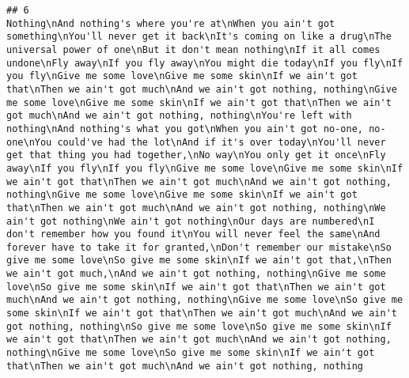 \documentclass[]{article}
\begin{document}
\begin{verbatim}
## 6                                                                                                                                                                                                                                                                                                                                                                                                                                                                                                                                                                                                                                                                                                                                                                                                                                                                                                                                                                                                                                                                                                                                                                                                                                                Nothing\nAnd nothing's where you're at\nWhen you ain't got something\nYou'll never get it back\nIt's coming on like a drug\nThe universal power of one\nBut it don't mean nothing\nIf it all comes undone\nFly away\nIf you fly away\nYou might die today\nIf you fly\nIf you fly\nGive me some love\nGive me some skin\nIf we ain't got that\nThen we ain't got much\nAnd we ain't got nothing, nothing\nGive me some love\nGive me some skin\nIf we ain't got that\nThen we ain't got much\nAnd we ain't got nothing, nothing\nYou're left with nothing\nAnd nothing's what you got\nWhen you ain't got no-one, no-one\nYou could've had the lot\nAnd if it's over today\nYou'll never get that thing you had together,\nNo way\nYou only get it once\nFly away\nIf you fly\nIf you fly\nGive me some love\nGive me some skin\nIf we ain't got that\nThen we ain't got much\nAnd we ain't got nothing, nothing\nGive me some love\nGive me some skin\nIf we ain't got that\nThen we ain't got much\nAnd we ain't got nothing, nothing\nWe ain't got nothing\nWe ain't got nothing\nOur days are numbered\nI don't remember how you found it\nYou will never feel the same\nAnd forever have to take it for granted,\nDon't remember our mistake\nSo give me some love\nSo give me some skin\nIf we ain't got that,\nThen we ain't got much,\nAnd we ain't got nothing, nothing\nGive me some love\nSo give me some skin\nIf we ain't got that\nThen we ain't got much\nAnd we ain't got nothing, nothing\nGive me some love\nSo give me some skin\nIf we ain't got that\nThen we ain't got much\nAnd we ain't got nothing, nothing\nSo give me some love\nSo give me some skin\nIf we ain't got that\nThen we ain't got much\nAnd we ain't got nothing, nothing\nGive me some love\nSo give me some skin\nIf we ain't got that\nThen we ain't got much\nAnd we ain't got nothing, nothing

\end{verbatim}
\end{document}
